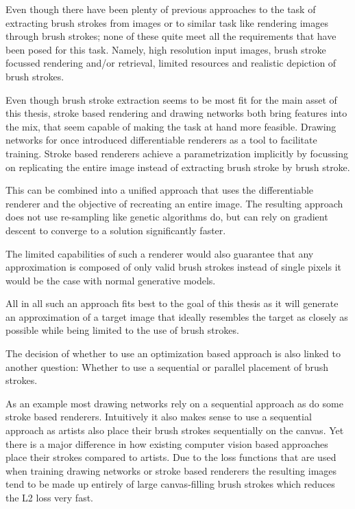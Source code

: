 Even though there have been plenty of previous approaches to the task of extracting
brush strokes from images or to similar task like rendering images through brush strokes;
none of these quite meet all the requirements that have been posed for this task.
Namely, high resolution input images, brush stroke focussed rendering and/or retrieval,
limited resources and realistic depiction of brush strokes.

Even though brush stroke extraction seems to be most fit for the main asset of
this thesis, stroke based rendering and drawing networks both bring features into
the mix, that seem capable of making the task at hand more feasible.
Drawing networks for once introduced differentiable renderers as a tool to facilitate
training.
Stroke based renderers achieve a parametrization implicitly by focussing on replicating
the entire image instead of extracting brush stroke by brush stroke.

This can be combined into a unified approach that uses the differentiable renderer
and the objective of recreating an entire image.
The resulting approach does not use re-sampling like genetic algorithms do, but
can rely on gradient descent to converge to a solution significantly faster.

The limited capabilities of such a renderer would also guarantee that any approximation
is composed of only valid brush strokes instead of single pixels it would be the
case with normal generative models.

All in all such an approach fits best to the goal of this thesis as it will generate
an approximation of a target image that ideally resembles the target as closely as
possible while being limited to the use of brush strokes.



The decision of whether to use an optimization based approach is also linked to
another question: Whether to use a sequential or parallel placement of brush strokes.

As an example most drawing networks rely on a sequential approach as do some stroke
based renderers.
Intuitively it also makes sense to use a sequential approach as artists also place
their brush strokes sequentially on the canvas.
Yet there is a major difference in how existing computer vision based approaches
place their strokes compared to artists.
Due to the loss functions that are used when training drawing networks or stroke based
renderers the resulting images tend to be made up entirely of large canvas-filling
brush strokes which reduces the L2 loss very fast.

